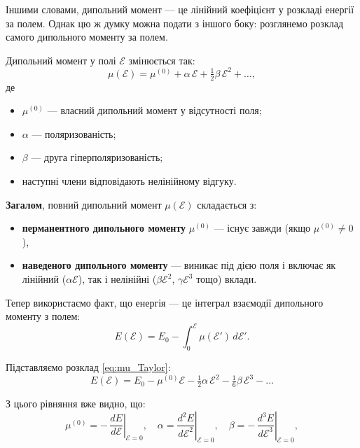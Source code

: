 Іншими словами, дипольний момент — це лінійний коефіцієнт у розкладі
енергії за полем. Однак цю ж думку можна подати з іншого боку:
розглянемо розклад самого дипольного моменту за полем.

Дипольний момент у полі $\mathcal{E}$ змінюється так:
\begin{equation}
	\mu(\mathcal{E})
	=
	\mu^{(0)}
	+
	\alpha\,\mathcal{E}
	+
	\tfrac12 \beta\,\mathcal{E}^2
	+\dots ,
	\label{eq:mu_Taylor}
\end{equation}
де
\begin{itemize}
	\item $\mu^{(0)}$ --- власний дипольний момент у відсутності поля;
	\item $\alpha$ --- поляризованість;
	\item $\beta$ --- друга гіперполяризованість;
	\item наступні члени відповідають нелінійному відгуку.
\end{itemize}

\textbf{Загалом}, повний дипольний момент \(\mu(\mathcal{E})\) складається з:
\begin{itemize}
	\item \textbf{перманентного дипольного моменту} \(\mu^{(0)}\) — існує завжди (якщо \(\mu^{(0)} \neq 0\)),
	\item \textbf{наведеного дипольного моменту} — виникає під дією поля і включає як лінійний (\(\alpha \mathcal{E}\)), так і нелінійні (\(\beta \mathcal{E}^2\), \(\gamma \mathcal{E}^3\) тощо) вклади.
\end{itemize}

Тепер використаємо факт, що енергія --- це інтеграл взаємодії дипольного моменту з полем:
\begin{equation}
	E(\mathcal{E})
	=
	E_0 - \int_0^{\mathcal{E}} \mu(\mathcal{E}')\, d\mathcal{E}'.
	\label{eq:E_as_integral_of_mu}
\end{equation}

Підставляємо розклад \eqref{eq:mu_Taylor}:
\begin{equation}
	E(\mathcal{E}) =
	E_0
	- \mu^{(0)}\mathcal{E}
	- \tfrac12 \alpha\,\mathcal{E}^2
	- \tfrac16 \beta\,\mathcal{E}^3
	- \dots
	\label{eq:E_expanded_correct}
\end{equation}

З цього рівняння вже видно, що:
\begin{equation}
	\mu^{(0)}  = -\,\left.\frac{dE}{d\mathcal{E}}\right|_{\mathcal{E}=0}, \quad
	\alpha     = \left.\frac{d^2E}{d\mathcal{E}^2}\right|_{\mathcal{E}=0}, \quad
	\beta      = -\,\left.\frac{d^3E}{d\mathcal{E}^3}\right|_{\mathcal{E}=0},
\end{equation}

